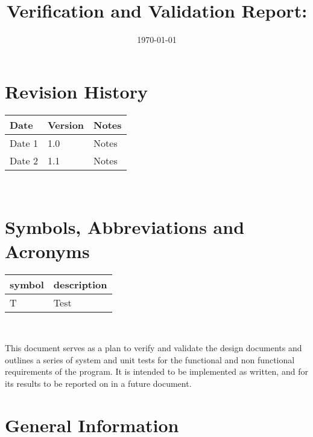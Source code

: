 \documentclass[12pt, titlepage]{article}
\begin{document}
\title{Verification and Validation Report: \progname} 
\author{\authname}
\date{\today}
	
\maketitle


\section{Revision History}

\begin{tabularx}{\textwidth}{p{3cm}p{2cm}X}
\toprule {\bf Date} & {\bf Version} & {\bf Notes}\\
\midrule
Date 1 & 1.0 & Notes\\
Date 2 & 1.1 & Notes\\
\bottomrule
\end{tabularx}

~\newpage

\section{Symbols, Abbreviations and Acronyms}

\renewcommand{\arraystretch}{1.2}
\begin{tabular}{l l} 
  \toprule		
  \textbf{symbol} & \textbf{description}\\
  \midrule 
  T & Test\\
  \bottomrule
\end{tabular}\\


\newpage

\tableofcontents

\listoftables %

\listoffigures %

\newpage


This document serves as a plan to verify and validate the design documents and outlines a series of system and unit tests for the functional and non functional requirements
of the program. It is intended to be implemented as written, and for its results to be reported on in a future document.

\section{General Information}
\end{document}
